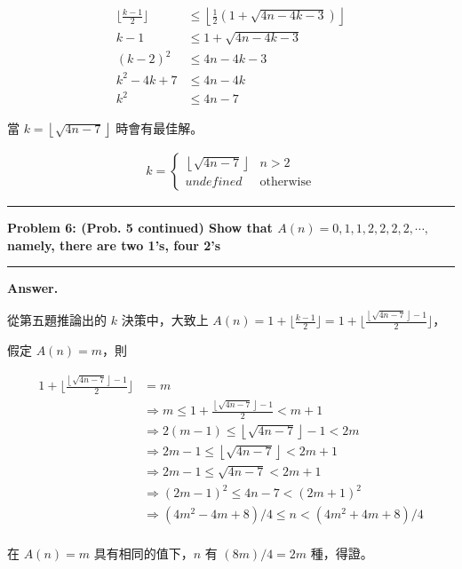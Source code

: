 \documentclass[11pt]{article}
\newcommand\question[2]{\vspace{.25in}\hrule\textbf{#1: #2}\vspace{.5em}\hrule\vspace{.10in}}
\renewcommand\part[1]{\vspace{.10in}\textbf{#1}}
\begin{document}
\begin{align*}
\lfloor \frac{k-1}{2} \rfloor &\le \left \lfloor \frac{1}{2} (1 + \sqrt{4n - 4k - 3}) \right \rfloor \\
k-1 &\le 1 + \sqrt{4n - 4k - 3} \\
(k-2)^2 &\le 4n - 4k - 3 \\
k^2 - 4k+7 &\le 4n - 4k \\
k^2 &\le 4n - 7 
\end{align*}

當 $k = \left \lfloor \sqrt{4n - 7} \right \rfloor$ 時會有最佳解。

\begin{align*}
k = \left\{\begin{matrix}
\left \lfloor \sqrt{4n - 7} \right \rfloor & n > 2 \\
\textit{undefined} & \text{otherwise}
\end{matrix}\right.
\end{align*}

\question{Problem 6}{(Prob. 5 continued) Show that $A(n) = 0, 1, 1, 2, 2, 2, 2, \cdots, $ 
namely, there are two 1's, four 2's
}

\part{Answer.}

從第五題推論出的 $k$ 決策中，大致上 $A(n) = 1 + \lfloor \frac{k-1}{2} \rfloor = 1 + \lfloor \frac{\left \lfloor \sqrt{4n - 7} \right \rfloor-1}{2} \rfloor$，

假定 $A(n) = m$，則

\begin{align*}
1 + \lfloor \frac{\left \lfloor \sqrt{4n - 7} \right \rfloor-1}{2} \rfloor &= m \\
&\Rightarrow m \le 1 + \frac{\left \lfloor \sqrt{4n - 7} \right \rfloor-1}{2} < m+1 \\
&\Rightarrow 2(m-1) \le \left \lfloor \sqrt{4n - 7} \right \rfloor-1 < 2m \\
&\Rightarrow 2m-1 \le \left \lfloor \sqrt{4n - 7} \right \rfloor < 2m+1 \\
&\Rightarrow 2m-1 \le \sqrt{4n - 7} < 2m+1 \\
&\Rightarrow (2m-1)^2 \le 4n-7 < (2m+1)^2 \\
&\Rightarrow (4m^2 - 4m + 8)/4 \le n < (4m^2 + 4m + 8)/4 \\
\end{align*}

在 $A(n) = m$ 具有相同的值下，$n$ 有 $(8m)/4 = 2m$ 種，得證。
\end{document}
